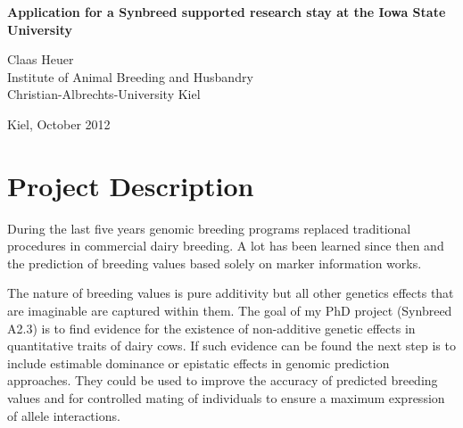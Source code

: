 \documentclass[a4paper,DIVcalc,12pt,liststotoc,headsepline,plainheadsepline]{scrartcl}
\begin{document}
\begin{titlepage}
\vspace*{3cm}
\begin{center}
\Large
\textbf{Application for a Synbreed supported research stay at the Iowa State University}
\end{center}





\vspace*{7cm}
\begin{center}
\large
Claas Heuer\\
Institute of Animal Breeding and Husbandry\\
Christian-Albrechts-University Kiel\\
\end{center}




\begin{center}
Kiel, October 2012
\end{center}




\end{titlepage}
\clearpage
{}
\thispagestyle{sectionstyle}
\tableofcontents
\clearpage
\thispagestyle{sectionstyle}

\section{Project Description}

During the last five years genomic breeding programs replaced traditional procedures in commercial dairy breeding. A lot has been learned since then and the prediction of breeding values based solely on marker information works. 

The nature of breeding values is pure additivity but all other genetics effects that are imaginable are captured within them.
The goal of my PhD project (Synbreed A2.3) is to find evidence for the existence of non-additive genetic effects in quantitative traits of dairy cows. If such evidence can be found the next step is to include estimable dominance or epistatic effects in genomic prediction approaches. They could be used to improve the accuracy of predicted breeding values \citep{bayesd} and for controlled mating of individuals to ensure a maximum expression of allele interactions.
\end{document}

